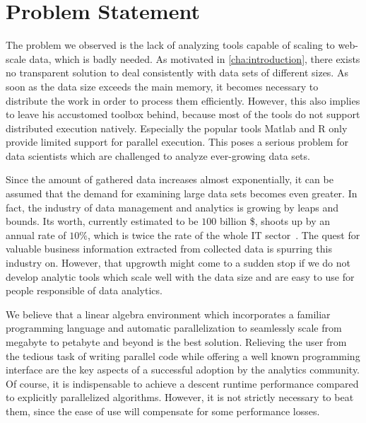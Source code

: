 \chapter{Problem Statement}
\label{cha:problemstatement}


The problem we observed is the lack of analyzing tools capable of scaling to web-scale data, which is badly needed.
As motivated in \cref{cha:introduction}, there exists no transparent solution to deal consistently with data sets of different sizes.
As soon as the data size exceeds the main memory, it becomes necessary to distribute the work in order to process them efficiently.
However, this also implies to leave his accustomed toolbox behind, because most of the tools do not support distributed execution natively.
Especially the popular tools Matlab and R only provide limited support for parallel execution.
This poses a serious problem for data scientists which are challenged to analyze ever-growing data sets.

Since the amount of gathered data increases almost exponentially, it can be assumed that the demand for examining large data sets becomes even greater.
In fact, the industry of data management and analytics is growing by leaps and bounds.
Its worth, currently estimated to be $100$ billion \$, shoots up by an annual rate of $10\%$, which is twice the rate of the whole IT sector~\cite{economist}.
The quest for valuable business information extracted from collected data is spurring this industry on.
However, that upgrowth might come to a sudden stop if we do not develop analytic tools which scale well with the data size and are easy to use for people responsible of data analytics.

We believe that a linear algebra environment which incorporates a familiar programming language and automatic parallelization to seamlessly scale from megabyte to petabyte and beyond is the best solution.
Relieving the user from the tedious task of writing parallel code while offering a well known programming interface are the key aspects of a successful adoption by the analytics community.
Of course, it is indispensable to achieve a descent runtime performance compared to explicitly parallelized algorithms.
However, it is not strictly necessary to beat them, since the ease of use will compensate for some performance losses.

